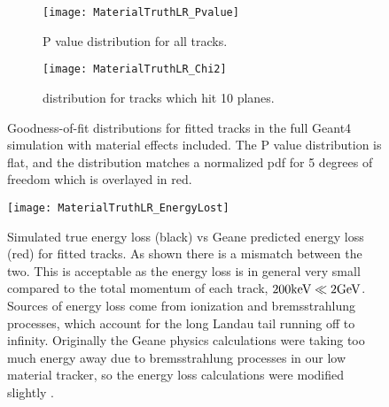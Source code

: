     \begin{figure}[]
    \centering
        \begin{subfigure}[t]{0.45\textwidth}
            \centering
            \texttt{[image: MaterialTruthLR\_Pvalue]}
            \caption{P value distribution for all tracks.}
        \end{subfigure}
        \begin{subfigure}[t]{0.45\textwidth}
            \centering
            \texttt{[image: MaterialTruthLR\_Chi2]}
            \caption{\chisq distribution for tracks which hit 10 planes.}
        \end{subfigure}
    \caption[P value and \chisq distribution for fitted tracks in the \gmtwo Geant4 simulation with material effects included]{Goodness-of-fit distributions for fitted tracks in the full \gmtwo Geant4 simulation with material effects included. The P value distribution is flat, and the \chisq distribution matches a normalized \chisq pdf for 5 degrees of freedom which is overlayed in red.}
    \label{fig:MaterialGoodnessOfFit}
    \end{figure}

    \begin{figure}[]
      \centering
      \texttt{[image: MaterialTruthLR\_EnergyLost]}
        \caption[Simulated true energy loss vs Geane predicted energy loss for tracks]{Simulated true energy loss (black) vs Geane predicted energy loss (red) for fitted tracks. As shown there is a mismatch between the two. This is acceptable as the energy loss is in general very small compared to the total momentum of each track, $200\text{k\text{e\kern-0.15ex V}} \ll 2 \text{G\text{e\kern-0.15ex V}}$. Sources of energy loss come from ionization and bremsstrahlung processes, which account for the long Landau tail running off to infinity. Originally the Geane physics calculations were taking too much energy away due to bremsstrahlung processes in our low material tracker, so the energy loss calculations were modified slightly \cite{trackfittingdoc}.}
        \label{fig:EnergyLossComparison}
    \end{figure}

